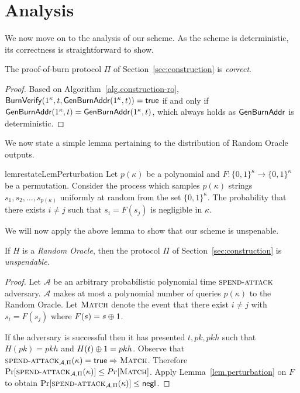\section{Analysis}\label{sec:analysis}

We now move on to the analysis of our scheme. As the scheme is deterministic,
its correctness is straightforward to show.

\begin{theorem}[Correctness]
  The proof-of-burn protocol $\Pi$ of Section~\ref{sec:construction} is \emph{correct}.
\end{theorem}
\begin{proof}
  Based on Algorithm~\ref{alg.construction-ro}, $\mathsf{BurnVerify}(1^\kappa, t, \mathsf{Gen}\-\mathsf{Burn}\-\mathsf{Addr}(1^\kappa, t)) = \textsf{true}$ if and only if $\mathsf{Gen}\-\mathsf{Burn}\-\mathsf{Addr}(1^\kappa, t) = \mathsf{Gen}\-\mathsf{Burn}\-\mathsf{Addr}(1^\kappa, t)$, which always holds as $\mathsf{Gen}\-\mathsf{Burn}\-\mathsf{Addr}$ is deterministic.
\end{proof}

We now state a simple lemma pertaining to the distribution of Random Oracle
outputs.

\begin{restatable}[Perturbation]{lem}{restateLemPerturbation}
  \label{lem.perturbation}
  Let $p(\kappa)$ be a polynomial and
  $F: \{0,1\}^\kappa \longrightarrow \{0,1\}^\kappa$ be a permutation.
  Consider the process which samples $p(\kappa)$ strings $s_1, s_2, \dots, s_{p(\kappa)}$ uniformly at random from the set $\{0, 1\}^\kappa$. The probability that there exists $i \neq j$ such that $s_i = F(s_j)$ is negligible in $\kappa$.
\end{restatable}

We will now apply the above lemma to show that our scheme is unspenable.

\begin{theorem}[Unspendability]
  If $H$ is a \emph{Random Oracle}, then the protocol $\Pi$ of Section~\ref{sec:construction} is \emph{unspendable}.
\end{theorem}
\begin{proof}
  Let $\mathcal{A}$ be an arbitrary probabilistic polynomial time $\textsc{spend}\-\text{-}\-\textsc{attack}$ adversary.
  $\mathcal{A}$ makes at most a polynomial number of queries $p(\kappa)$ to the Random Oracle.
  Let $\textsc{Match}$ denote the event
  that there exist $i \neq j$ with $s_i = F(s_j)$ where $F(s) = s \oplus 1$.

  If the adversary is successful then it has presented $t, pk, pkh$ such that $H(pk) = pkh$ and $H(t) \oplus 1 = pkh$.
  Observe that $\textsc{spend}\-\text{-}\-\textsc{attack}_{\mathcal{A}, \Pi}(\kappa) = \textsf{true} \Rightarrow \textsc{Match}$.
  Therefore $\Pr[\textsc{spend}\-\text{-}\-\textsc{attack}_{\mathcal{A}, \Pi}(\kappa)] \leq Pr[\textsc{Match}]$. Apply Lemma~\ref{lem.perturbation} on $F$
  to obtain
  $\Pr[\textsc{spend}\-\text{-}\-\textsc{attack}_{\mathcal{A}, \Pi}(\kappa)] \leq \mathsf{negl}$.
\end{proof}

